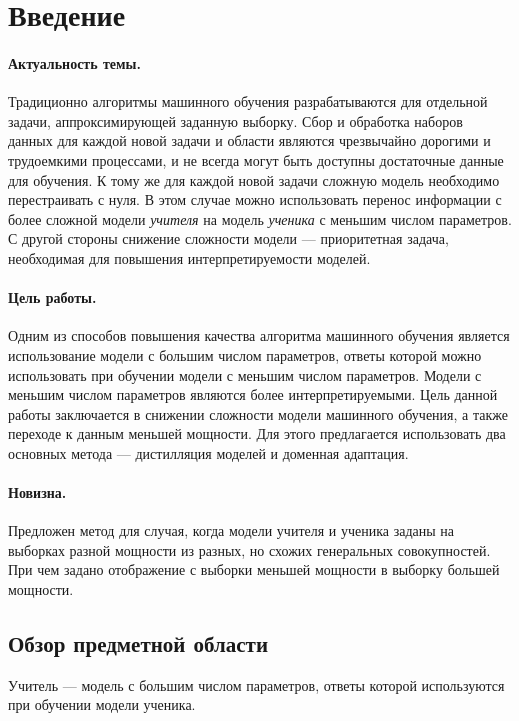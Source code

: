 \newpage


\section{Введение}

\paragraph{Актуальность темы.} Традиционно алгоритмы машинного обучения разрабатываются для отдельной задачи, аппроксимирующей заданную выборку. Сбор и обработка наборов данных для каждой новой задачи и области являются чрезвычайно дорогими и трудоемкими процессами, и не всегда могут быть доступны достаточные данные для обучения. К тому же для каждой новой задачи сложную модель необходимо перестраивать с нуля. В этом случае можно использовать перенос информации с более сложной модели \textit{учителя} на модель \textit{ученика} с меньшим числом параметров. С другой стороны снижение сложности модели --- приоритетная задача, необходимая для повышения интерпретируемости моделей.

\paragraph{Цель работы.} Одним из способов повышения качества алгоритма машинного обучения является использование модели с большим числом параметров, ответы которой можно использовать при обучении модели с меньшим числом параметров. Модели с меньшим числом параметров являются более интерпретируемыми. Цель данной работы заключается в снижении сложности модели машинного обучения, а также переходе к данным меньшей мощности. Для этого предлагается использовать два основных метода --- дистилляция моделей и доменная адаптация.

\paragraph{Новизна.} Предложен метод для случая, когда модели учителя и ученика заданы на выборках разной мощности из разных, но схожих генеральных совокупностей. При чем задано отображение с выборки меньшей мощности в выборку большей мощности.

\subsection{Обзор предметной области}

\begin{definition}
Учитель --- модель с большим числом параметров, ответы которой используются при обучении модели ученика.
\end{definition}

